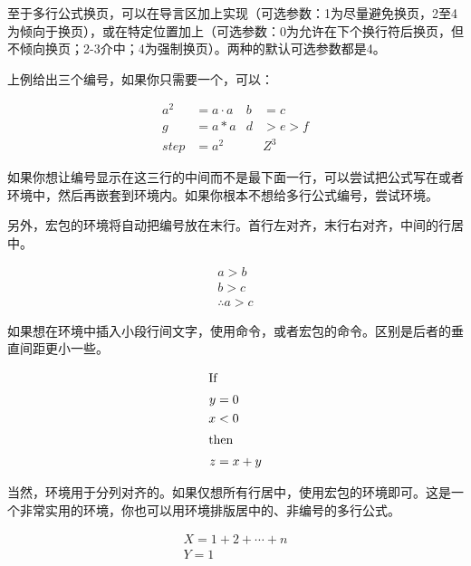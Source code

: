 至于多行公式换页，可以在导言区加上实现（可选参数：1为尽量避免换页，2至4为倾向于换页），或在特定位置加上（可选参数：0为允许在下个换行符后换页，但不倾向换页；2-3介中；4为强制换页）。两种的默认可选参数都是4。

上例给出三个编号，如果你只需要一个，可以：

\begin{codeshow}
\begin{align}
  a^2&= a\cdot a& b&=c\nonumber\\
  g  &= a*a & d&>e>f  \nonumber\\
  step&= a^2 & &Z^3
\end{align}
\end{codeshow}

如果你想让编号显示在这三行的中间而不是最下面一行，可以尝试把公式写在或者环境中，然后再嵌套到环境内。如果你根本不想给多行公式编号，尝试环境。

另外，宏包的环境将自动把编号放在末行。首行左对齐，末行右对齐，中间的行居中。
\begin{codeshow}
\begin{multline}
a>b \\
b>c \\
\therefore a>c
\end{multline}
\end{codeshow}

如果想在环境中插入小段行间文字，使用命令，或者宏包的命令。区别是后者的垂直间距更小一些。

\begin{codeshow}
\begin{align*}
\shortintertext{If}
 y &= 0 \\
 x &< 0\\
\shortintertext{then}
 z &= x+y
\end{align*}
\end{codeshow}

当然，环境用于分列对齐的。如果仅想所有行居中，使用宏包的环境即可。这是一个非常实用的环境，你也可以用环境排版居中的、非编号的多行公式。

\begin{codeshow}
\begin{gather}
  X=1+2+\cdots+n \\
  Y=1
\end{gather}
\end{codeshow}

